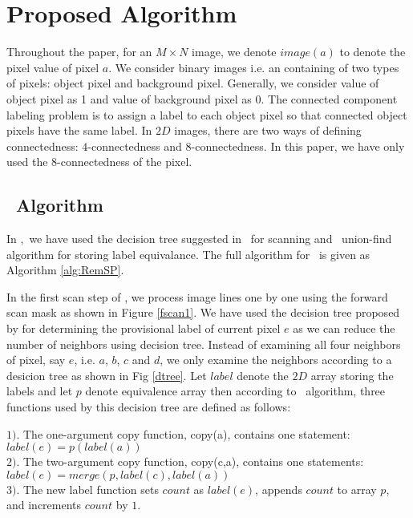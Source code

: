\section{Proposed Algorithm}
\label{sec:proposed_algorithm}

Throughout the paper, for an $M \times N$ image, we denote $image(a)$ to denote the pixel value of pixel $a$.
We consider binary images i.e. an containing of two types of pixels: object pixel and 
background pixel. Generally, we consider value of object pixel as 1 and value of background pixel as 0. The connected
component labeling problem is to assign a label to each object pixel so that connected object pixels have the same label.
In $2D$ images, there are two ways of defining connectedness: $4$-connectedness and $8$-connectedness. In this paper, we have 
only used the $8$-connectedness of the pixel.


\vspace{3mm}
\subsection{\remsp\ Algorithm}

In \remsp,\ we have used the decision tree suggested in \lrpc\ 
for scanning and \rems\ union-find algorithm for storing label equivalance. The
full algorithm for \remsp\ is given as Algorithm \ref{alg:RemSP}.

In the first scan step of \remsp, we process image lines one by one using the
forward scan mask as shown in Figure \ref{fscan1}. We have used the decision tree proposed by \cite{Wu2009_LRPC} for determining the provisional label of current pixel $e$ as we can reduce the number of neighbors using decision tree. Instead of
examining all four neighbors of pixel, say $e$, i.e. $a$, $b$, $c$ and $d$, we only
examine the neighbors according to a desicion tree as shown in Fig \ref{dtree}.
 Let $label$ denote the $2D$ array storing the labels and let $p$ denote equivalence array 
 then according to \lrpc\ algorithm,
three functions used by this decision tree are defined as follows:

$1)$. The one-argument copy function, copy(a), contains one statement:
					$label(e) = p(label(a))$\\
$2)$. The two-argument copy function, copy(c,a), contains one statements:
				$label(e) = merge(p, label(c), label(a))$\\
$3)$. The new label function sets $count$ as $label(e)$, appends $count$ to array $p$, and increments $count$ by $1$.

